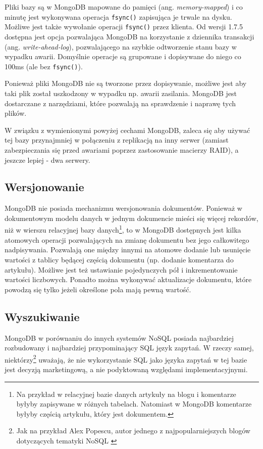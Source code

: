 Pliki bazy są w MongoDB mapowane do pamięci (ang. \emph{memory-mapped}) i co minutę jest wykonywana operacja \verb+fsync()+ zapisująca je trwale na dysku.
Możliwe jest także wywołanie operacji \verb+fsync()+ przez klienta.
Od wersji 1.7.5 dostępna jest opcja pozwalająca MongoDB na korzystanie z dziennika transakcji (ang. \emph{write-ahead-log}), pozwalającego na szybkie odtworzenie stanu bazy w wypadku awarii.
Domyślnie operacje są grupowane i dopisywane do niego co 100ms (ale bez \verb+fsync()+).

Ponieważ pliki MongoDB nie są tworzone przez dopisywanie, możliwe jest aby taki plik został uszkodzony w wypadku np. awarii zasilania.
MongoDB jest dostarczane z narzędziami, które pozwalają na sprawdzenie i naprawę tych plików.

W związku z wymienionymi powyżej cechami MongoDB, zaleca się aby używać tej bazy przynajmniej w połączeniu z replikacją na inny serwer (zamiast zabezpieczania się przed awariami poprzez zastosowanie macierzy RAID), a jeszcze lepiej - dwa serwery.

\subsection*{Wersjonowanie}

MongoDB nie posiada mechanizmu wersjonowania dokumentów.
Ponieważ w dokumentowym modelu danych w jednym dokumencie mieści się więcej rekordów, niż w wierszu relacyjnej bazy danych\footnote{Na przykład w relacyjnej bazie danych artykuły na blogu i komentarze byłyby zapisywane w różnych tabelach. Natomiast w MongoDB komentarze byłyby częścią artykułu, który jest dokumentem.}, to w MongoDB dostępnych jest kilka atomowych operacji pozwalających na zmianę dokumentu bez jego całkowitego nadpisywania.
Pozwalają one między innymi na atomowe dodanie lub usunięcie wartości z tablicy będącej częścią dokumentu (np. dodanie komentarza do artykułu).
Możliwe jest też ustawianie pojedynczych pół i inkrementowanie wartości liczbowych.
Ponadto można wykonywać aktualizacje dokumentu, które powodzą się tylko jeżeli określone pola mają pewną wartość.

\subsection*{Wyszukiwanie}

MongoDB w porównaniu do innych systemów NoSQL posiada najbardziej rozbudowany i najbardziej przypominający SQL język zapytań.
W rzeczy samej, niektórzy\footnote{Jak na przykład Alex Popescu, autor jednego z najpopularniejszych blogów dotyczących tematyki NoSQL \cite{popescu-mongodb-sql}} uważają, że nie wykorzystanie SQL jako języka zapytań w tej bazie jest decyzją marketingową, a nie podyktowaną względami implementacyjnymi.


